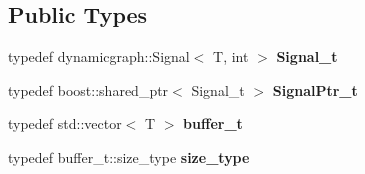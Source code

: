 \subsection*{Public Types}
\begin{DoxyCompactItemize}
\item 
typedef dynamicgraph\+::\+Signal$<$ T, int $>$ {\bfseries Signal\+\_\+t}\hypertarget{structdynamic__graph_1_1internal_1_1BindedSignal_acdaa84070d25691ad72731f04be389fa}{}\label{structdynamic__graph_1_1internal_1_1BindedSignal_acdaa84070d25691ad72731f04be389fa}

\item 
typedef boost\+::shared\+\_\+ptr$<$ Signal\+\_\+t $>$ {\bfseries Signal\+Ptr\+\_\+t}\hypertarget{structdynamic__graph_1_1internal_1_1BindedSignal_a1fd1a14632e5ebfecd9b32aa3d295194}{}\label{structdynamic__graph_1_1internal_1_1BindedSignal_a1fd1a14632e5ebfecd9b32aa3d295194}

\item 
typedef std\+::vector$<$ T $>$ {\bfseries buffer\+\_\+t}\hypertarget{structdynamic__graph_1_1internal_1_1BindedSignal_a16a9c323d576287f0f053236b43ec78e}{}\label{structdynamic__graph_1_1internal_1_1BindedSignal_a16a9c323d576287f0f053236b43ec78e}

\item 
typedef buffer\+\_\+t\+::size\+\_\+type {\bfseries size\+\_\+type}\hypertarget{structdynamic__graph_1_1internal_1_1BindedSignal_a20afb053e85bdb54b31702d0d58ded53}{}\label{structdynamic__graph_1_1internal_1_1BindedSignal_a20afb053e85bdb54b31702d0d58ded53}

\end{DoxyCompactItemize}
